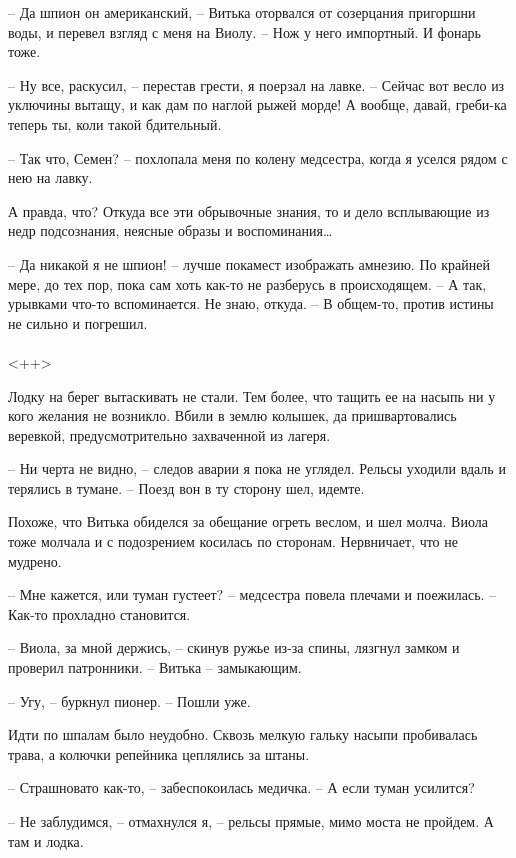 \documentclass[a4paper]{book}
\begin{document}
-- Да шпион он американский, -- Витька оторвался от созерцания пригоршни воды, и перевел взгляд с меня на Виолу. -- Нож у него импортный. И фонарь тоже. 

-- Ну все, раскусил, -- перестав грести, я поерзал на лавке. -- Сейчас вот весло из уключины вытащу, и как дам по наглой рыжей морде! А вообще, давай, греби-ка теперь ты, коли такой бдительный.

-- Так  что, Семен? -- похлопала меня по колену медсестра, когда я уселся рядом с нею на лавку. 

А правда, что? Откуда все эти обрывочные знания, то и дело всплывающие из недр подсознания, неясные образы и воспоминания\ldots

-- Да никакой я не шпион! -- лучше покамест изображать амнезию. По крайней мере, до тех пор, пока сам хоть как-то не разберусь в происходящем. -- А так, урывками что-то вспоминается. Не знаю, откуда. -- В общем-то, против истины не сильно и погрешил.

\paragraph{}<++>

Лодку на берег вытаскивать не стали. Тем более, что тащить ее на насыпь ни у кого желания не возникло. Вбили в землю колышек, да пришвартовались веревкой, предусмотрительно захваченной из лагеря.

-- Ни черта не видно, -- следов аварии я пока не углядел. Рельсы уходили вдаль и терялись в тумане. -- Поезд вон в ту сторону шел, идемте.

Похоже, что Витька обиделся за обещание огреть веслом, и шел молча. Виола тоже молчала и с подозрением косилась по сторонам. Нервничает, что не мудрено.  

-- Мне кажется, или туман густеет? -- медсестра повела плечами и поежилась. -- Как-то прохладно становится.

-- Виола, за мной держись, -- скинув ружье из-за спины, лязгнул замком и проверил патронники. -- Витька -- замыкающим.

-- Угу, -- буркнул пионер. -- Пошли уже.

Идти по шпалам было неудобно. Сквозь мелкую гальку насыпи пробивалась трава, а колючки репейника цеплялись за штаны. 

-- Страшновато как-то, -- забеспокоилась медичка. -- А если туман усилится?

-- Не заблудимся, -- отмахнулся я, -- рельсы прямые, мимо моста не пройдем. А там и лодка. 
\end{document}
